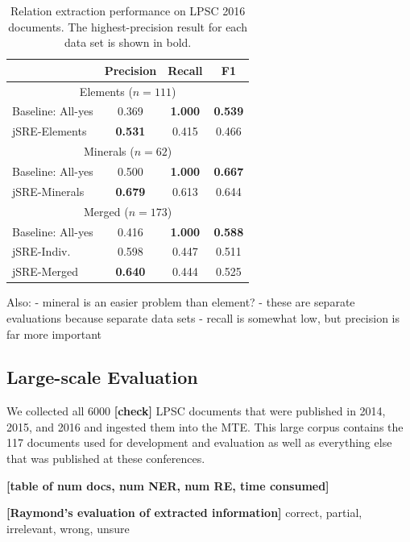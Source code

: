 \documentclass[letterpaper]{article} %
\begin{document}

\begin{table}
\caption{Relation extraction performance on LPSC 2016 documents. 
The highest-precision result for each data set is shown in bold.}
\label{tab:re}
\begin{center}
\begin{tabular}{l|ccc}
 & Precision & Recall & F1 \\ \hline
\multicolumn{4}{c}{Elements ($n=111$)} \\
Baseline: All-yes & 0.369 & {\bf 1.000} & {\bf 0.539} \\ 
jSRE-Elements & {\bf 0.531} & 0.415 & 0.466 \\ \hline
\multicolumn{4}{c}{Minerals ($n=62$)} \\
Baseline: All-yes & 0.500 & {\bf 1.000} & {\bf 0.667} \\ 
jSRE-Minerals & {\bf 0.679} & 0.613 & 0.644 \\ \hline 
\multicolumn{4}{c}{Merged ($n=173$)} \\
Baseline: All-yes & 0.416 & {\bf 1.000} & {\bf 0.588} \\ 
jSRE-Indiv.  & 0.598 & 0.447 & 0.511 \\
jSRE-Merged  & {\bf 0.640} & 0.444 & 0.525 \\ \hline
\end{tabular}
\end{center}
\end{table}

Also:
- mineral is an easier problem than element?
- these are separate evaluations because separate data sets
- recall is somewhat low, but precision is far more important

\subsection{Large-scale Evaluation}

We collected all 6000 {\bf [check]} LPSC documents that were published
in 2014, 2015, and 2016 and ingested them into the MTE.  This large
corpus contains the 117 documents used for development and evaluation
as well as everything else that was published at these conferences.

{\bf [table of num docs, num NER, num RE, time consumed]}

{\bf [Raymond's evaluation of extracted information]}
correct, partial, irrelevant, wrong, unsure
\end{document}

